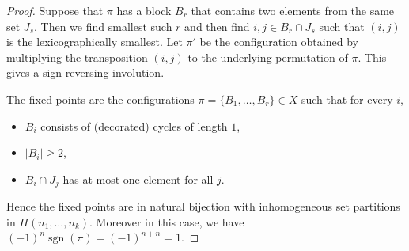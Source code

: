 \documentclass[oneside]{book}
\numberwithin{equation}{section}
\theoremstyle{definition}
\newcommand\sgn{\operatorname{sgn}}
\begin{document}
\begin{proof}
Suppose that \( \pi \) has a block \( B_r \) that contains two
elements from the same set \( J_s \). Then we find smallest such
\( r \) and then find \( i,j\in B_r\cap J_s \) such that \( (i,j) \)
is the lexicographically smallest. Let \( \pi' \) be the configuration
obtained by multiplying the transposition \( (i,j) \) to the
underlying permutation of \( \pi \). This gives a sign-reversing
involution.

The fixed points are the configurations
\( \pi = \{ B_1,\dots,B_r\}\in X \) such that
for every \( i \),
\begin{itemize}
\item \( B_i \) consists of (decorated) cycles of length \( 1 \),
\item \( |B_i|\ge2 \),
\item \( B_i\cap J_j \) has at most one element for all \( j \).
\end{itemize}
Hence the fixed points are in natural bijection with inhomogeneous set
partitions in \( \Pi(n_1,\dots,n_k) \). Moreover in this case, we have
\( (-1)^{n}\sgn(\pi) = (-1)^{n+n} = 1 \).
\end{proof}
\end{document}
